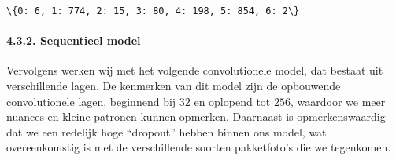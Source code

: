 \documentclass[11pt]{article}
\makeatletter
\newcommand{\boxspacing}{\kern\kvtcb@left@rule\kern\kvtcb@boxsep}
\newcommand{\prompt}[4]{
        {\ttfamily\llap{{\color{#2}[#3]:\hspace{3pt}#4}}\vspace{-\baselineskip}}
    }
\makeatother
\begin{document}
            \begin{tcolorbox}[breakable, size=fbox, boxrule=.5pt, pad at break*=1mm, opacityfill=0]
\prompt{Out}{outcolor}{81}{\boxspacing}
\begin{Verbatim}[commandchars=\\\{\}]
\{0: 6, 1: 774, 2: 15, 3: 80, 4: 198, 5: 854, 6: 2\}
\end{Verbatim}
\end{tcolorbox}
        
    \paragraph{4.3.2. Sequentieel model}\label{sequentieel-model}

Vervolgens werken wij met het volgende convolutionele model, dat bestaat
uit verschillende lagen. De kenmerken van dit model zijn de opbouwende
convolutionele lagen, beginnend bij \(32\) en oplopend tot \(256\),
waardoor we meer nuances en kleine patronen kunnen opmerken. Daarnaast
is opmerkenswaardig dat we een redelijk hoge ``dropout'' hebben binnen
ons model, wat overeenkomstig is met de verschillende soorten
pakketfoto's die we tegenkomen.
\end{document}
